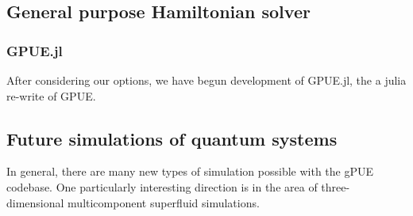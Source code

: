 \subsection{General purpose Hamiltonian solver}

\subsubsection{GPUE.jl}
After considering our options, we have begun development of GPUE.jl, the a julia re-write of GPUE.

\subsection{Future simulations of quantum systems}

In general, there are many new types of simulation possible with the gPUE codebase.
One particularly interesting direction is in the area of three-dimensional multicomponent superfluid simulations.
